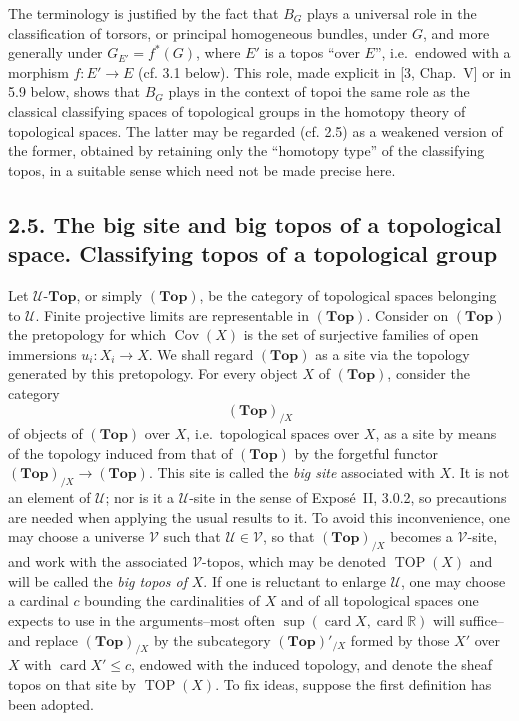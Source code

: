 \documentclass[11pt]{article}
\newcommand{\U}{\mathcal{U}}
\newcommand{\V}{\mathcal{V}}
\newcommand{\Esp}{\mathbf{Top}}
\newcommand{\TOP}{\operatorname{TOP}}
\newcommand{\Cov}{\operatorname{Cov}}
\newcommand{\ie}{i.e.}
\providecommand{\Cov}{\operatorname{Cov}}
\begin{document}
The terminology is justified by the fact that \(B_G\) plays a universal role in the classification of torsors, or principal homogeneous bundles, under \(G\), and more generally under \(G_{E'}=f^\ast(G)\), where \(E'\) is a topos ``over \(E\)'', \ie\ endowed with a morphism \(f:E'\to E\) (cf. 3.1 below). This role, made explicit in [3, Chap.~V] or in 5.9 below, shows that \(B_G\) plays in the context of topoi the same role as the classical classifying spaces of topological groups in the homotopy theory of topological spaces. The latter may be regarded (cf. 2.5) as a weakened version of the former, obtained by retaining only the ``homotopy type'' of the classifying topos, in a suitable sense which need not be made precise here.

\subsection*{2.5. The big site and big topos of a topological space. Classifying topos of a topological group}
Let \(\U\text{-}\Esp\), or simply \((\Esp)\), be the category of topological spaces belonging to \(\U\). Finite projective limits are representable in \((\Esp)\). Consider on \((\Esp)\) the pretopology for which \(\Cov(X)\) is the set of surjective families of open immersions \(u_i:X_i\to X\). We shall regard \((\Esp)\) as a site via the topology generated by this pretopology. For every object \(X\) of \((\Esp)\), consider the category
\[
(\Esp)_{/X}
\]
of objects of \((\Esp)\) over \(X\), \ie\ topological spaces over \(X\), as a site by means of the topology induced from that of \((\Esp)\) by the forgetful functor \((\Esp)_{/X}\to(\Esp)\). This site is called the \emph{big site} associated with \(X\). It is not an element of \(\U\); nor is it a \(\U\)-site in the sense of Expos\'e~II, 3.0.2, so precautions are needed when applying the usual results to it. To avoid this inconvenience, one may choose a universe \(\V\) such that \(\U\in\V\), so that \((\Esp)_{/X}\) becomes a \(\V\)-site, and work with the associated \(\V\)-topos, which may be denoted \(\TOP(X)\) and will be called the \emph{big topos of} \(X\). If one is reluctant to enlarge \(\U\), one may choose a cardinal \(c\) bounding the cardinalities of \(X\) and of all topological spaces one expects to use in the arguments--most often \(\sup(\operatorname{card}X,\operatorname{card}\mathbb R)\) will suffice--and replace \((\Esp)_{/X}\) by the subcategory \((\Esp)'_{/X}\) formed by those \(X'\) over \(X\) with \(\operatorname{card}X'\le c\), endowed with the induced topology, and denote the sheaf topos on that site by \(\TOP(X)\). To fix ideas, suppose the first definition has been adopted.
\end{document}
